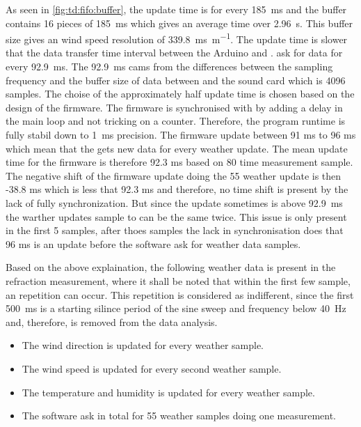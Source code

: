 As seen in \autoref{fig:td:fifo:buffer}, the update time is for every \SI{185}{\milli\second} and the buffer contains 16 pieces of \SI{185}{\milli\second} which gives an average time over \SI{2.96}{\second}. This buffer size gives an wind speed resolution of \SI{339.8}{\milli\second\per\meter}. The update time is slower that the data transfer time interval between the Arduino and \matlab. \matlab ask for data for every \SI{92.9}{\milli\second}. The \SI{92.9}{\milli\second} cams from the differences between the sampling frequency and the buffer size of data between \matlab and the sound card which is 4096 samples. The choise of the approximately half update time is chosen based on the design of the firmware. The firmware is synchronised with \matlab by adding a delay in the main loop and not tricking on a counter. Therefore, the program runtime is fully stabil down to \SI{1}{\milli\second} precision. The firmware update between 91 ms to 96 ms which mean that the \matlab gets new data for every weather update. The mean update time for the firmware is therefore 92.3 ms based on 80 time measurement sample.  The negative shift of the firmware update doing the 55 weather update is then -38.8 ms which is less that 92.3 ms and therefore, no time shift is present by the lack of fully synchronization. But since the update sometimes is above \SI{92.9}{\milli\second} the warther updates sample to \matlab can be the same twice. This issue is only present in the first 5 samples, after thoes samples the lack in synchronisation does that 96 ms is an update before the software ask for weather data samples. 

Based on the above explaination, the following weather data is present in the refraction measurement, where it shall be noted that within the first few sample, an repetition can occur. This repetition is considered as indifferent, since the first \SI{500}{\milli\second} is a starting silince period of the sine sweep and frequency below \SI{40}{\hertz} and, therefore, is removed from the data analysis. 

\begin{itemize}
\item The wind direction is updated for every weather sample.  
\item The wind speed is updated for every second weather sample.
\item The temperature and humidity is updated for every weather sample.
\item The \matlab software ask in total for 55 weather samples doing one measurement. 
\end{itemize}

